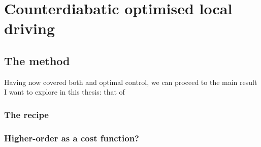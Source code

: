 \part{Counterdiabatic optimised local driving}
\chapter{The  method}

Having now covered both  and optimal control, we can proceed to the main result I want to explore in this thesis: that of 

\section{The recipe}

\section{Higher-order  as a cost function?}